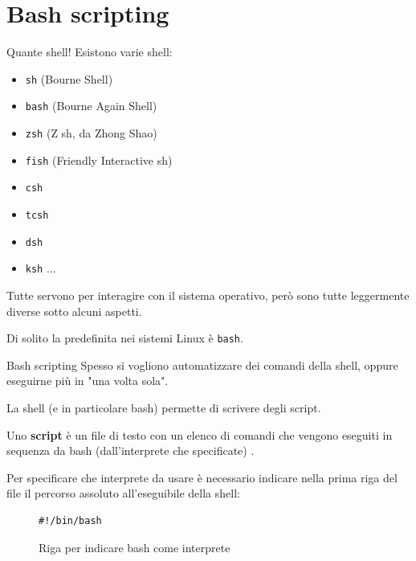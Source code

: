 \section{Bash scripting}
\begin{frame}[fragile]{Quante shell!}
  Esistono varie shell:
  \begin{itemize}
    \item \texttt{sh} (Bourne Shell)
    \item \texttt{bash} (Bourne Again Shell)
    \item \texttt{zsh} (Z sh, da Zhong Shao)
    \item \texttt{fish} (Friendly Interactive sh)
    \item \texttt{csh}
    \item \texttt{tcsh}
    \item \texttt{dsh}
    \item \texttt{ksh} ...
  \end{itemize}
  Tutte servono per interagire con il sistema operativo, però sono tutte 
  leggermente diverse sotto alcuni aspetti.\medskip

  Di solito la predefinita nei sistemi Linux è \texttt{bash}.
\end{frame}

\begin{frame}[fragile]{Bash scripting}
  Spesso si vogliono automatizzare dei comandi della shell, oppure eseguirne più
  in "una volta sola". \medskip

  La shell (e in particolare bash) permette di scrivere degli script. \medskip

  Uno \textbf{script} è un file di testo con un elenco di comandi che vengono eseguiti in
  sequenza da bash (dall'interprete che specificate)
  .\medskip

  Per specificare che interprete da usare è necessario indicare nella prima riga
  del file il percorso assoluto all'eseguibile della shell: \smallskip

  \begin{figure}
    \begin{lstlisting}[backgroundcolor=\color{expowhite!50!white}]
#!/bin/bash
\end{lstlisting}
    \caption{Riga per indicare bash come interprete}
  \end{figure}
\end{frame}



